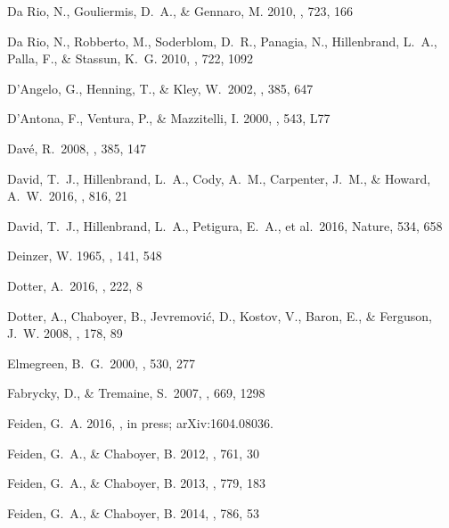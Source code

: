 \begin{thebibliography}{56}
{Da Rio}, N., {Gouliermis}, D.~A., \& {Gennaro}, M. 2010{}, \apj,
  723, 166

{Da Rio}, N., {Robberto}, M., {Soderblom}, D.~R., {Panagia}, N., {Hillenbrand},
  L.~A., {Palla}, F., \& {Stassun}, K.~G. 2010{}, \apj, 722, 1092

 D'Angelo, G., Henning, T., \& Kley, W.\ 2002, \aap, 385, 647

{D'Antona}, F., {Ventura}, P., \& {Mazzitelli}, I. 2000, \apj, 543, L77

 Dav{\'e}, R.\ 2008, \mnras, 385, 147

 David, T.~J., Hillenbrand, L.~A., Cody, A.~M., Carpenter, J.~M., \& Howard, A.~W.\ 2016, \apj, 816, 21

 David, T.~J., Hillenbrand, L.~A., Petigura, E.~A., et al.\ 2016, Nature, 534, 658

{Deinzer}, W. 1965, \apj, 141, 548

 Dotter, A.\ 2016, \apjs, 222, 8 

Dotter, A., Chaboyer, B., Jevremovi\'{c}, D., Kostov, V., Baron, E., \&
  Ferguson, J.~W. 2008, \apjs, 178, 89
  
 Elmegreen, B.~G.\ 2000, \apj, 530, 277

 Fabrycky, D., \& Tremaine, S.\ 2007, \apj, 669, 1298

{Feiden}, G.~A. 2016, \aap, in press; arXiv:1604.08036.

{Feiden}, G.~A., \& {Chaboyer}, B. 2012, \apj, 761, 30

{Feiden}, G.~A., \& {Chaboyer}, B. 2013, \apj, 779, 183

{Feiden}, G.~A., \& {Chaboyer}, B. 2014{}, \apj, 786, 53


\end{thebibliography}

